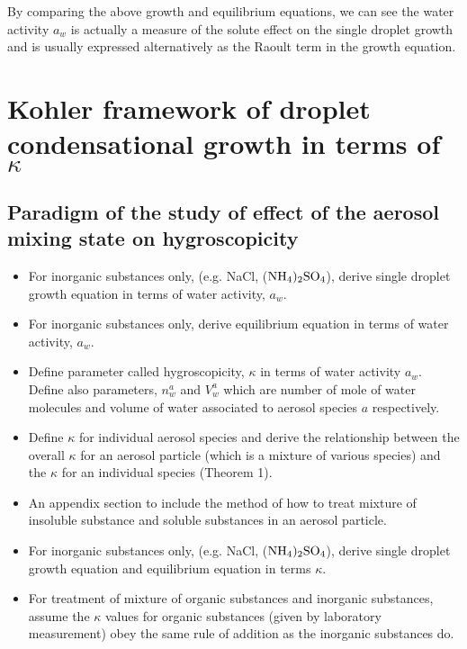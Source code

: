 \documentclass[12pt]{article}
\begin{document}
By comparing the above growth and equilibrium equations, we can see the water activity $a_{w}$ is actually a measure of the solute effect on the single droplet growth and is usually expressed alternatively as the Raoult term in the growth equation.


\section{Kohler framework of droplet condensational growth in terms of $\kappa$}

\subsection{Paradigm of the study of effect of the aerosol mixing state on hygroscopicity}

\begin{itemize}

\item For inorganic substances only, (e.g. NaCl, ($ \rm NH_{4})_{2} \rm SO_{4}$), derive single droplet growth equation in terms of water activity, $a_{w}$.

\item For inorganic substances only, derive equilibrium equation in terms of water activity, $a_{w}$.

\item Define parameter called hygroscopicity, $\kappa$ in terms of water activity $a_{w}$. Define also parameters, $n_{w}^{a}$ and $V_{w}^{a}$ which are number of mole of water molecules and volume of water associated to aerosol species $a$ respectively. 

\item Define $\kappa$ for individual aerosol species and derive the relationship between the overall $\kappa$ for an aerosol particle (which is a mixture of various species) and the $\kappa$ for an individual species (Theorem 1). 

\item An appendix section to include the method of how to treat mixture of insoluble substance and soluble substances in an aerosol particle.

\item For inorganic substances only, (e.g. NaCl, ($ \rm NH_{4})_{2} \rm SO_{4}$), derive single droplet growth equation and equilibrium equation in terms $\kappa$.

\item For treatment of mixture of organic substances and inorganic substances, assume the $\kappa$ values for organic substances (given by laboratory measurement) obey the same rule of addition as the inorganic substances do.

\end{itemize}
\end{document}
